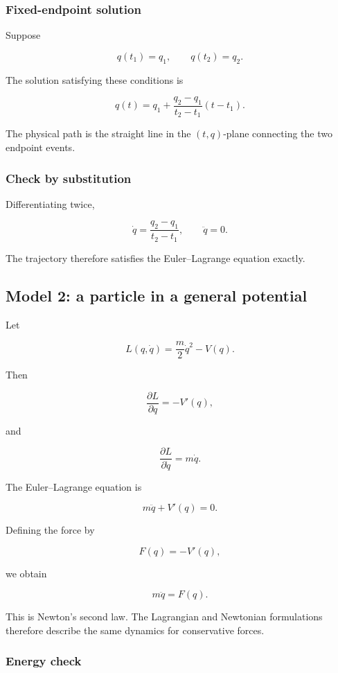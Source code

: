 \subsubsection{Fixed-endpoint solution}

Suppose

\[
q(t_{1})=q_{1},
\qquad
q(t_{2})=q_{2}.
\]

The solution satisfying these conditions is

\[
\boxed{
q(t)
=
q_{1}
+
\frac{q_{2}-q_{1}}{t_{2}-t_{1}}
(t-t_{1})
}.
\]

The physical path is the straight line in the \((t,q)\)-plane connecting the two endpoint events.

\subsubsection{Check by substitution}

Differentiating twice,

\[
\dot q
=
\frac{q_{2}-q_{1}}{t_{2}-t_{1}},
\qquad
\ddot q=0.
\]

The trajectory therefore satisfies the Euler--Lagrange equation exactly.

\subsection{Model 2: a particle in a general potential}

Let

\[
L(q,\dot q)
=
\frac{m}{2}\dot q^{2}-V(q).
\]

Then

\[
\frac{\partial L}{\partial q}
=
-V'(q),
\]

and

\[
\frac{\partial L}{\partial\dot q}
=
m\dot q.
\]

The Euler--Lagrange equation is

\[
m\ddot q+V'(q)=0.
\]

Defining the force by

\[
F(q)
=
-V'(q),
\]

we obtain

\[
\boxed{
m\ddot q=F(q)
}.
\]

This is Newton's second law. The Lagrangian and Newtonian formulations therefore describe the same dynamics for conservative forces.

\subsubsection{Energy check}

